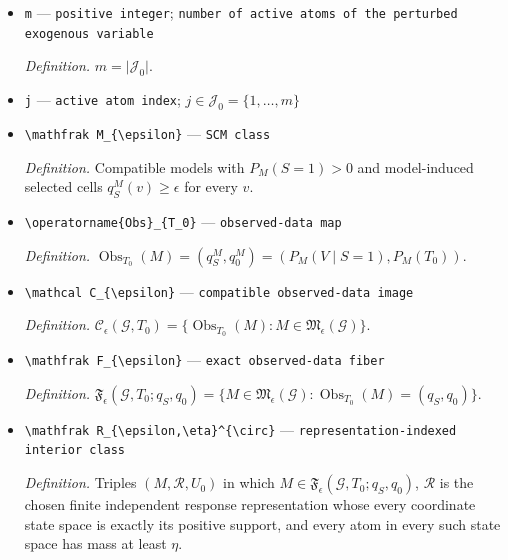 \documentclass{article}
\begin{document}
\begin{itemize}
  \item \texttt{m} --- \texttt{positive integer}; \texttt{number of active atoms of the perturbed exogenous variable}
  \par\smallskip\noindent\emph{Definition.} \(m=\lvert\mathcal J_0\rvert\).
  \item \texttt{j} --- \texttt{active atom index}; \(j\in\mathcal J_0=\{1,\ldots,m\}\)
  \item \texttt{\textbackslash{}\allowbreak{}mathfrak M\_\allowbreak{}\{\textbackslash{}\allowbreak{}epsilon\}\allowbreak{}} --- \texttt{SCM class}
  \par\smallskip\noindent\emph{Definition.} Compatible models with \(P_M(S=1)>0\) and model-induced selected cells \(q_S^M(v)\ge\epsilon\) for every \(v\).
  \item \texttt{\textbackslash{}\allowbreak{}operatorname\{Obs\}\allowbreak{}\_\allowbreak{}\{T\_\allowbreak{}0\}\allowbreak{}} --- \texttt{observed-\allowbreak{}data map}
  \par\smallskip\noindent\emph{Definition.} \(\operatorname{Obs}_{T_0}(M)=(q_S^M,q_0^M)=(P_M(V\mid S=1),P_M(T_0))\).
  \item \texttt{\textbackslash{}\allowbreak{}mathcal C\_\allowbreak{}\{\textbackslash{}\allowbreak{}epsilon\}\allowbreak{}} --- \texttt{compatible observed-\allowbreak{}data image}
  \par\smallskip\noindent\emph{Definition.} \(\mathcal C_{\epsilon}(\mathcal G,T_0)=\{\operatorname{Obs}_{T_0}(M):M\in\mathfrak M_{\epsilon}(\mathcal G)\}\).
  \item \texttt{\textbackslash{}\allowbreak{}mathfrak F\_\allowbreak{}\{\textbackslash{}\allowbreak{}epsilon\}\allowbreak{}} --- \texttt{exact observed-\allowbreak{}data fiber}
  \par\smallskip\noindent\emph{Definition.} \(\mathfrak F_{\epsilon}(\mathcal G,T_0;q_S,q_0)=\{M\in\mathfrak M_{\epsilon}(\mathcal G):\operatorname{Obs}_{T_0}(M)=(q_S,q_0)\}\).
  \item \texttt{\textbackslash{}\allowbreak{}mathfrak R\_\allowbreak{}\{\textbackslash{}\allowbreak{}epsilon,\allowbreak{}\textbackslash{}\allowbreak{}eta\}\allowbreak{}\textasciicircum{}\{\textbackslash{}\allowbreak{}circ\}\allowbreak{}} --- \texttt{representation-\allowbreak{}indexed interior class}
  \par\smallskip\noindent\emph{Definition.} Triples \((M,\mathcal R,U_0)\) in which \(M\in\mathfrak F_{\epsilon}(\mathcal G,T_0;q_S,q_0)\), \(\mathcal R\) is the chosen finite independent response representation whose every coordinate state space is exactly its positive support, and every atom in every such state space has mass at least \(\eta\).

\end{itemize}
\end{document}
